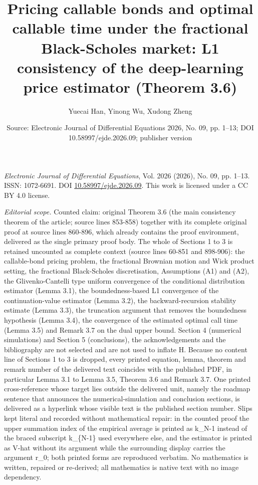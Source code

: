 \documentclass[10pt,a4paper]{amsart}
\title[Pricing callable bonds and optimal callable time under the Fractional Black-Scholes market]{Pricing callable bonds and optimal callable time under the fractional Black-Scholes market: L1 consistency of the deep-learning price estimator (Theorem 3.6)}
\author{Yuecai Han, Yinong Wu, Xudong Zheng}
\date{Source: Electronic Journal of Differential Equations 2026, No. 09, pp. 1--13; DOI 10.58997/ejde.2026.09; publisher version}
\numberwithin{equation}{section}
\begin{document}
\maketitle
\noindent\emph{Electronic Journal of Differential Equations}, Vol. 2026 (2026), No. 09, pp. 1--13.\newline
ISSN: 1072-6691. DOI \href{https://doi.org/10.58997/ejde.2026.09}{10.58997/ejde.2026.09}. This work is licensed under a CC BY 4.0 license.\par\smallskip
\noindent\textit{Editorial scope.} Counted claim: original Theorem 3.6 (the main consistency theorem of the article; source lines 853-858) together with its complete original proof at source lines 860-896, which already contains the proof environment, delivered as the single primary proof body. The whole of Sections 1 to 3 is retained uncounted as complete context (source lines 60-851 and 898-906): the callable-bond pricing problem, the fractional Brownian motion and Wick product setting, the fractional Black-Scholes discretisation, Assumptions (A1) and (A2), the Glivenko-Cantelli type uniform convergence of the conditional distribution estimator (Lemma 3.1), the boundedness-based L1 convergence of the continuation-value estimator (Lemma 3.2), the backward-recursion stability estimate (Lemma 3.3), the truncation argument that removes the boundedness hypothesis (Lemma 3.4), the convergence of the estimated optimal call time (Lemma 3.5) and Remark 3.7 on the dual upper bound. Section 4 (numerical simulations) and Section 5 (conclusions), the acknowledgements and the bibliography are not selected and are not used to inflate H. Because no content line of Sections 1 to 3 is dropped, every printed equation, lemma, theorem and remark number of the delivered text coincides with the published PDF, in particular Lemma 3.1 to Lemma 3.5, Theorem 3.6 and Remark 3.7. One printed cross-reference whose target lies outside the delivered unit, namely the roadmap sentence that announces the numerical-simulation and conclusion sections, is delivered as a hyperlink whose visible text is the published section number. Slips kept literal and recorded without mathematical repair: in the counted proof the upper summation index of the empirical average is printed as k\_N-1 instead of the braced subscript k\_\{N-1\} used everywhere else, and the estimator is printed as V-hat without its argument while the surrounding display carries the argument r\_0; both printed forms are reproduced verbatim. No mathematics is written, repaired or re-derived; all mathematics is native text with no image dependency.
\end{document}
